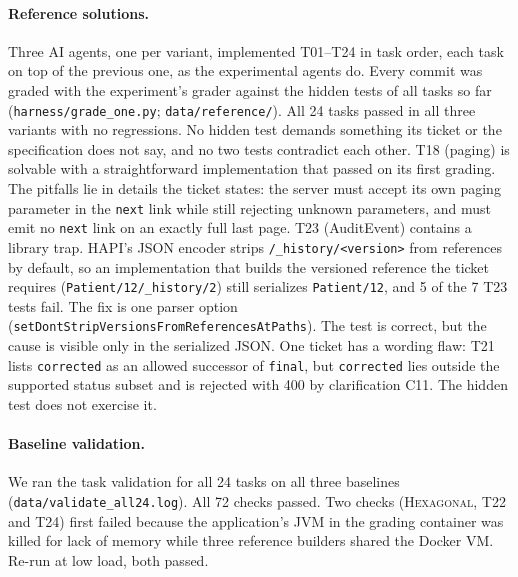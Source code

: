 \documentclass[10pt]{article}
\newcommand{\HEX}{\textsc{Hexagonal}}
\newcommand{\code}[1]{\texttt{#1}}
\begin{document}
\paragraph{Reference solutions.} Three AI agents, one per variant, implemented T01--T24 in task
order, each task on top of the previous one, as the experimental agents do. Every commit was graded
with the experiment's grader against the hidden tests of all tasks so far
(\code{harness/grade\_one.py}; \code{data/reference/}). All 24 tasks passed in all three variants
with no regressions. No hidden test demands something its ticket or the specification does not
say, and no two tests contradict each other. T18 (paging) is solvable with a straightforward
implementation that passed on its first grading. The pitfalls lie in details the ticket states: the
server must accept its own paging parameter in the \code{next} link while still rejecting unknown
parameters, and must emit no \code{next} link on an exactly full last page. T23 (AuditEvent)
contains a library trap. HAPI's JSON encoder strips \code{/\_history/<version>} from references by
default, so an implementation that builds the versioned reference the ticket requires
(\code{Patient/12/\_history/2}) still serializes \code{Patient/12}, and 5 of the 7 T23 tests fail.
The fix is one parser option (\code{setDontStripVersionsFromReferencesAtPaths}). The test is
correct, but the cause is visible only in the serialized JSON. One ticket has a wording flaw: T21
lists \code{corrected} as an allowed successor of \code{final}, but \code{corrected} lies outside the
supported status subset and is rejected with 400 by clarification C11. The hidden test does not
exercise it.

\paragraph{Baseline validation.} We ran the task validation for all 24 tasks on all three
baselines (\code{data/validate\_all24.log}). All 72 checks passed. Two checks (\HEX, T22 and
T24) first failed because the application's JVM in the grading container was killed for lack of
memory while three reference builders shared the Docker VM. Re-run at low load, both passed.
\end{document}
